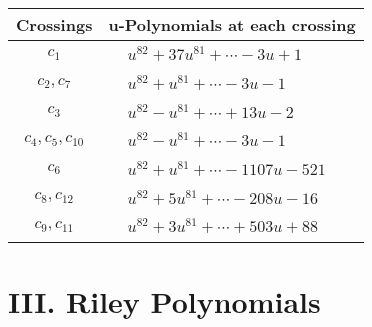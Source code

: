\documentclass[1p]{elsarticle_modified}
\theoremstyle{definition}
\begin{document}
\begin{tabular}{m{50pt}|m{274pt}}
Crossings & \hspace{64pt}u-Polynomials at each crossing \\
\hline $$\begin{aligned}c_{1}\end{aligned}$$&$\begin{aligned}
&u^{82}+37 u^{81}+\cdots-3 u+1
\end{aligned}$\\
\hline $$\begin{aligned}c_{2},c_{7}\end{aligned}$$&$\begin{aligned}
&u^{82}+u^{81}+\cdots-3 u-1
\end{aligned}$\\
\hline $$\begin{aligned}c_{3}\end{aligned}$$&$\begin{aligned}
&u^{82}- u^{81}+\cdots+13 u-2
\end{aligned}$\\
\hline $$\begin{aligned}c_{4},c_{5},c_{10}\end{aligned}$$&$\begin{aligned}
&u^{82}- u^{81}+\cdots-3 u-1
\end{aligned}$\\
\hline $$\begin{aligned}c_{6}\end{aligned}$$&$\begin{aligned}
&u^{82}+u^{81}+\cdots-1107 u-521
\end{aligned}$\\
\hline $$\begin{aligned}c_{8},c_{12}\end{aligned}$$&$\begin{aligned}
&u^{82}+5 u^{81}+\cdots-208 u-16
\end{aligned}$\\
\hline $$\begin{aligned}c_{9},c_{11}\end{aligned}$$&$\begin{aligned}
&u^{82}+3 u^{81}+\cdots+503 u+88
\end{aligned}$\\
\hline
\end{tabular}\newpage\renewcommand{\arraystretch}{1}
\centering \section*{ III. Riley Polynomials}
\end{document}
